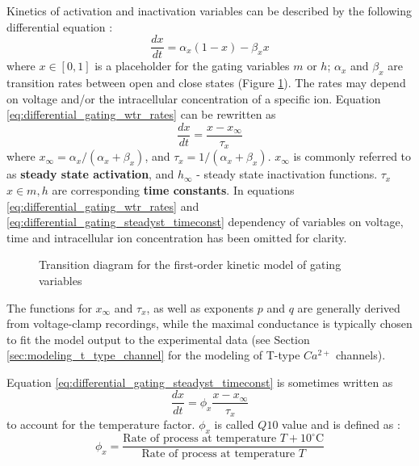 \documentclass[../main.tex]{subfiles}
\begin{document}
Kinetics of activation and inactivation variables can be described by the following differential equation \parencite{wangModelTtypeCalcium1991}:
\begin{equation} \label{eq:differential_gating_wtr_rates}
    \frac{dx}{dt} = \alpha_x (1 - x) - \beta_x x
\end{equation}
where $x \in [0, 1]$ is a placeholder for the gating variables $m$ or $h$; $\alpha_x$ and $\beta_x$ are transition rates between open and close states (Figure \ref{fig:gating_first_order_kinetics}). The rates may depend on voltage and/or the intracellular concentration of a specific ion. Equation \ref{eq:differential_gating_wtr_rates} can be rewritten as
\begin{equation} \label{eq:differential_gating_steadyst_timeconst}
    \frac{dx}{dt} = \frac{x - x_{\infty}}{\tau_x}
\end{equation}
where $x_{\infty}=\alpha_x/(\alpha_x + \beta_x)$, and $\tau_{x}=1/(\alpha_x + \beta_x)$.
$x_\infty$ is commonly referred to as \textbf{steady state activation}, and $h_\infty$ - steady state inactivation functions. $\tau_{x}$ $x\in{m,h}$ are corresponding \textbf{time constants}.
In equations \ref{eq:differential_gating_wtr_rates} and \ref{eq:differential_gating_steadyst_timeconst} dependency of variables on voltage, time and intracellular ion concentration has been omitted for clarity.

\begin{figure}[!t]
    \centering
    \caption{Transition diagram for the first-order kinetic model of gating variables}
    \label{fig:gating_first_order_kinetics}
\end{figure}

The functions for $x_\infty$ and $\tau_x$, as well as exponents $p$ and $q$ are generally derived from voltage-clamp recordings, while the maximal conductance is typically chosen to fit the model output to the experimental data (see Section \ref{sec:modeling_t_type_channel} for the modeling of T-type $Ca^{2+}$ channels).

Equation \ref{eq:differential_gating_steadyst_timeconst} is sometimes written as
\begin{equation}\label{eq:differential_gating_steadyst_timeconst_q10}
    \frac{dx}{dt} = \phi_x\frac{x - x_{\infty}}{\tau_x}
\end{equation}
to account for the temperature factor. $\phi_x$ is called $Q10$ value and is defined as \parencite{sterrattQ10EffectTemperature2015}:
\begin{equation}
    \phi_x=\frac{\text{Rate of process at temperature $T+10^\circ$C}}{\text{Rate of process at temperature $T$}}
\end{equation}
\end{document}

